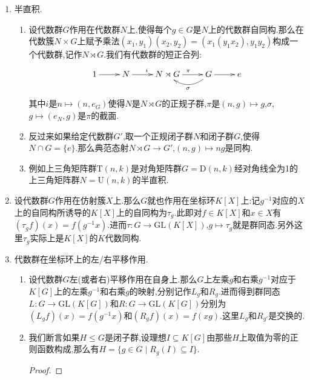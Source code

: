 \begin{enumerate}
\begin{proof}
    	取$y\in X$,它的轨道是$Y=Gy$.按照$Y$是$G\to X$,$g\mapsto gy$的像,所以它是可构造子集.于是$Y$包含了$\overline{Y}$的某个开子集.但是$G$在$Y$上的作用是可迁的,就得到$Y$是$\overline{Y}$的开子集,同样的原因结合$Y$上至少存在一个正则点说明$Y$是正则的.我们有$\overline{Y}-Y$是闭子集,但是这个闭子集在$G$作用下不变,于是它是维数严格小于$\dim\overline{Y}$的一些轨道的并.
    \end{proof}
    \item 半直积.
    \begin{enumerate}[(1)]
    	\item 设代数群$G$作用在代数群$N$上,使得每个$g\in G$是$N$上的代数群自同构.那么在代数簇$N\times G$上赋予乘法$(x_1,y_1)(x_2,y_2)=(x_1(y_1x_2),y_1y_2)$构成一个代数群,记作$N\rtimes G$.我们有代数群的短正合列:
    	$$\xymatrix{1\ar[r]&N\ar[r]^i&N\rtimes G\ar[r]^{\pi}&G\ar[r]\ar@/^1pc/[l]^{\sigma}&e}$$
    	其中$i$是$n\mapsto(n,e_G)$使得$N$是$N\rtimes G$的正规子群,$\pi$是$(n,g)\mapsto g$,$\sigma$,$g\mapsto(e_N,g)$是$\pi$的截面.
    	\item 反过来如果给定代数群$G'$,取一个正规闭子群$N$和闭子群$G$,使得$N\cap G=\{e\}$.那么典范态射$N\rtimes G\to G'$,$(n,g)\mapsto ng$是同构.
    	\item 例如上三角矩阵群$\mathrm{T}(n,k)$是对角矩阵群$G=\mathrm{D}(n,k)$经对角线全为1的上三角矩阵群$N=\mathrm{U}(n,k)$的半直积.
    \end{enumerate}
    \item 设代数群$G$作用在仿射簇$X$上.那么$G$就也作用在坐标环$K[X]$上:记$g^{-1}$对应的$X$上的自同构所诱导的$K[X]$上的自同构为$\tau_g$.此即对$f\in K[X]$和$x\in X$有$(\tau_gf)(x)=f(g^{-1}x)$.进而$\tau:G\to\mathrm{GL}(K[X])$,$g\mapsto\tau_g$就是群同态.另外这里$\tau_g$实际上是$K[X]$的$K$代数同构.
    \item 代数群在坐标环上的左/右平移作用.
    \begin{enumerate}[(1)]
    	\item 设代数群$G$左(或者右)平移作用在自身上.那么$G$上左乘$g$和右乘$g^{-1}$对应于$K[G]$上的左乘$g^{-1}$和右乘$g$的映射,分别记作$L_g$和$R_g$.进而得到群同态$L:G\to\mathrm{GL}(K[G])$和$R:G\to\mathrm{GL}(K[G])$分别为$(L_gf)(x)=f(g^{-1}x)$和$(R_gf)(x)=f(xg)$.这里$L_g$和$R_{g'}$是交换的.
    	\item 我们断言如果$H\le G$是闭子群,设理想$I\subseteq K[G]$由那些$H$上取值为零的正则函数构成,那么有$H=\{g\in G\mid R_g(I)\subseteq I\}$.
    	\begin{proof}
    		

\end{proof}
\end{enumerate}
\end{enumerate}
